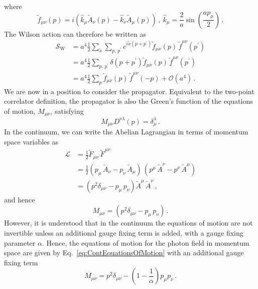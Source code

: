%
where
%
\begin{equation}
\tilde{f}_{\mu\nu}(p) = i\left(\hat{k}_\mu \tilde{A}_\nu(p) - \hat{k}_\nu \tilde{A}_\mu(p)\right)\, ,~\hat{k}_\mu = \frac{2}{a}\sin\left(\frac{ap_\mu}{2}\right)\, .
\end{equation}
%
The Wilson action can therefore be written as
%
\begin{align}
\mathcal{S}_\text{W} &= a^4\frac{1}{2}\sum_{\tilde{x}}\sum_{p,\,p^\prime}e^{i\tilde{x}(p+p^\prime)}\tilde{f}_{\mu\nu}(p) \, \tilde{f}^{\mu\nu}(p^\prime)\nonumber\\
&=a^4\frac{1}{2}\sum_{p,\,p^\prime} \delta(p+p^\prime)\tilde{f}_{\mu\nu}(p) \, \tilde{f}^{\mu\nu}(p^\prime) \nonumber\\
&= a^4\frac{1}{2}\sum_{p}\tilde{f}_{\mu\nu}(p) \, \tilde{f}^{\mu\nu}(-p) + \mathcal{O}(a^4)\, . \label{eq:WilsonMomentum}
\end{align}
%
We are now in a position to consider the propagator. Equivalent to the two-point correlator definition, the propagator is also the Green's function of the equations of motion, $M_{\mu\nu}$, satisfying
%
\begin{equation}
M_{\mu\nu}D^{\nu\lambda}(p) = \delta_\mu^\lambda\, .
\end{equation}
%
In the continuum, we can write the Abelian Lagrangian in terms of momentum space variables as 
%
\begin{align*}
\mathcal{L} &= \frac{1}{2}\tilde{F}_{\mu\nu}\,\tilde{F}^{\mu\nu}\\
&= \frac{1}{2}(p_\mu\,\tilde{A}_\nu - p_\nu\,\tilde{A}_\mu)\,(p^\mu\,\tilde{A}^\nu - p^\nu\,\tilde{A}^\mu)\\
&= (p^2\delta_{\mu\nu} - p_\mu\,p_\nu)\tilde{A}^\mu\,\tilde{A}^\nu\, ,
\end{align*}
%
and hence
%
\begin{equation}
M_{\mu\nu} = (p^2\delta_{\mu\nu} - p_\mu\,p_\nu)\, .
\label{eq:ContEquationsOfMotion}
\end{equation}
%
However, it is understood that in the continuum the equations of motion are not invertible unless an additional gauge fixing term is added, with a gauge fixing parameter $\alpha$. Hence, the equations of motion for the photon field in momentum space are given by Eq.~\ref{eq:ContEquationsOfMotion} with an additional gauge fixing term~\cite{ryder1996quantum}
%
\begin{equation}
M_{\mu\nu} = p^2\delta_{\mu\nu} - \left(1-\frac{1}{\alpha}\right)p_\mu p_\nu\, .
\end{equation}
